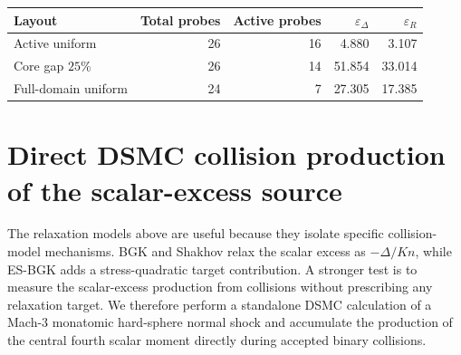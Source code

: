 \documentclass[lineno,paper]{JFM-FLM_Au}
\newcommand{\revisionbox}[1]{\colorbox{revisionyellow}{#1}}
\newcommand{\revisionbox}[1]{#1}
\newcommand{\Kn}{\mathit{Kn}}
\begin{document}
\par\medskip\noindent\begin{minipage}{\linewidth}\makeatletter{}\makeatother
\revisionbox{\begin{minipage}{0.96\linewidth}\captionsetup{width=\linewidth}
\caption{Mach-5 probe-placement sensitivity corresponding to figure~\ref{fig:revision_sparse_gap}. The final two columns are relative $L_2$ errors in percent on the active interval $|\Delta|\geq0.02\max|\Delta|$. Counts distinguish all probes from probes within that interval. The channel $S$ is supplied exactly and no noise is added, so the test isolates scalar interpolation error. Full-domain uniform has fewer total probes and is not an equal-count comparison.}
\label{tab:sparse_placement}
\centering\small\setlength{\tabcolsep}{7pt}
\begin{tabular}{lrrrr}\toprule
Layout & Total probes & Active probes & $\varepsilon_\Delta$ & $\varepsilon_R$\\\midrule
Active uniform & 26 & 16 & 4.880 & 3.107\\
Core gap $25\%$ & 26 & 14 & 51.854 & 33.014\\
Full-domain uniform & 24 & 7 & 27.305 & 17.385\\
\bottomrule\end{tabular}\par
\end{minipage}}\par\end{minipage}\par\medskip

\section{Direct DSMC collision production of the scalar-excess source}
\label{sec:dsmc}

The relaxation models above are useful because they isolate specific collision-model mechanisms.  BGK and Shakhov relax the scalar excess as $-\Delta/\Kn$, while ES-BGK adds a stress-quadratic target contribution.  A stronger test is to measure the scalar-excess production from collisions without prescribing any relaxation target.  We therefore perform a standalone DSMC calculation of a Mach-3 monatomic hard-sphere normal shock and accumulate the production of the central fourth scalar moment directly during accepted binary collisions.
\end{document}
